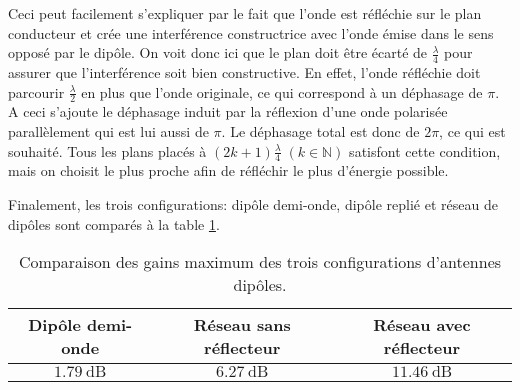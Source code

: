 Ceci peut facilement s'expliquer par le fait que l'onde est réfléchie sur le plan conducteur et crée une interférence constructrice avec l'onde émise dans le sens opposé par le dipôle. On voit donc ici que le plan doit être écarté de $\frac{\lambda}{4}$ pour assurer que l'interférence soit bien constructive. En effet, l'onde réfléchie doit parcourir $\frac{\lambda}{2}$ en plus que l'onde originale, ce qui correspond à un déphasage de $\pi$. A ceci s'ajoute le déphasage induit par la réflexion d'une onde polarisée parallèlement qui est lui aussi de $\pi$. Le déphasage total est donc de $2\pi$, ce qui est souhaité. Tous les plans placés à $(2k+1)\frac{\lambda}{4} \; (k \in \mathbb{N})$ satisfont cette condition, mais on choisit le plus proche afin de réfléchir le plus d'énergie possible.

Finalement, les trois configurations: dipôle demi-onde, dipôle replié et réseau de dipôles sont comparés à la table \ref{tbl:comp}.
\begin{table}[htbp]
\begin{tabular}{ccc}
  \hline
       Dipôle demi-onde & Réseau sans réflecteur & Réseau avec réflecteur \\
  \hline
  $\SI{1.79}{\deci\bel}$ & $\SI{6.27}{\deci\bel}$ & $\SI{11.46}{\deci\bel}$ \\
  \hline
\end{tabular}
\caption{Comparaison des gains maximum des trois configurations d'antennes dipôles.\label{tbl:comp}}
\end{table}


